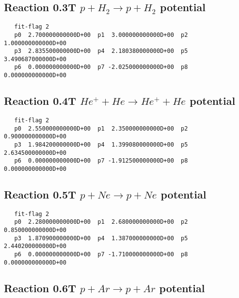 \documentclass[12pt]{article}
\begin{document}
\newpage

\subsection{
Reaction 0.3T    $p + H_2 \rightarrow p + H_2 $ potential  
}

\begin{small}\begin{verbatim}
   fit-flag 2
   p0  2.700000000000D+00  p1  3.000000000000D+00  p2  1.000000000000D+00
   p3  2.835500000000D+00  p4  2.180380000000D+00  p5  3.490687000000D+00
   p6  0.000000000000D+00  p7 -2.025000000000D+00  p8  0.000000000000D+00
\end{verbatim}\end{small}


\newpage

\subsection{
Reaction 0.4T   $  He^+ + He \rightarrow He^+ + He $ potential 
}

\begin{small}\begin{verbatim}
   fit-flag 2
   p0  2.550000000000D+00  p1  2.350000000000D+00  p2  0.900000000000D+00
   p3  1.984200000000D+00  p4  1.399080000000D+00  p5  2.634500000000D+00
   p6  0.000000000000D+00  p7 -1.912500000000D+00  p8  0.000000000000D+00
\end{verbatim}\end{small}


\newpage

\subsection{
Reaction 0.5T   $ p + Ne \rightarrow p + Ne $ potential 
}

\begin{small}\begin{verbatim}
   fit-flag 2
   p0  2.280000000000D+00  p1  2.680000000000D+00  p2  0.850000000000D+00
   p3  1.870900000000D+00  p4  1.387000000000D+00  p5  2.440200000000D+00
   p6  0.000000000000D+00  p7 -1.710000000000D+00  p8  0.000000000000D+00
\end{verbatim}\end{small}


\newpage

\subsection{
Reaction 0.6T   $ p + Ar \rightarrow p + Ar $ potential }
\end{document}
